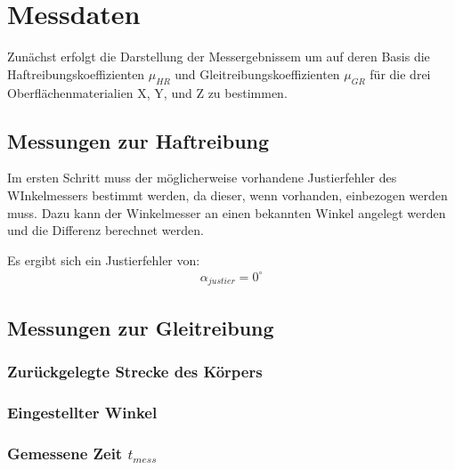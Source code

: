 \section{Messdaten}

Zunächst erfolgt die Darstellung der Messergebnissem um auf deren Basis die Haftreibungskoeffizienten $\mu_{HR}$ und Gleitreibungskoeffizienten $\mu_{GR}$ für die drei Oberflächenmaterialien X, Y, und Z zu bestimmen.

\subsection{Messungen zur Haftreibung}

Im ersten Schritt muss der möglicherweise vorhandene Justierfehler des WInkelmessers bestimmt werden, da dieser, wenn vorhanden, einbezogen werden muss. Dazu kann der Winkelmesser an einen bekannten Winkel angelegt werden und die Differenz berechnet werden. 

Es ergibt sich ein Justierfehler von:
\begin{align*}
    \alpha_{justier} = 0^\circ
\end{align*}

\subsection{Messungen zur Gleitreibung}

\subsubsection{Zurückgelegte Strecke des Körpers}

\subsubsection{Eingestellter Winkel}

\subsubsection{Gemessene Zeit $t_{mess}$}